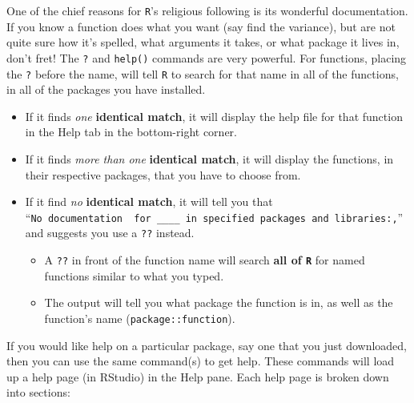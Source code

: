 \documentclass[]{article}
\providecommand{\tightlist}{%
  \setlength{\itemsep}{0pt}\setlength{\parskip}{0pt}}
\begin{document}
One of the chief reasons for \texttt{R}'s religious following is its
wonderful documentation. If you know a function does what you want (say
find the variance), but are not quite sure how it's spelled, what
arguments it takes, or what package it lives in, don't fret! The
\texttt{?} and \texttt{help()} commands are very powerful. For
functions, placing the \texttt{?} before the name, will tell \texttt{R}
to search for that name in all of the functions, in all of the packages
you have installed.

\begin{itemize}
\item
  If it finds \emph{one} \textbf{identical match}, it will display the
  help file for that function in the Help tab in the bottom-right
  corner.\\
\item
  If it finds \emph{more than one} \textbf{identical match}, it will
  display the functions, in their respective packages, that you have to
  choose from.\\
\item
  If it find \emph{no} \textbf{identical match}, it will tell you that
  ``\texttt{No\ documentation\ \ for\ \_\_\_\_\ in\ specified\ packages\ and\ libraries:,}''
  and suggests you use a \texttt{??} instead.

  \begin{itemize}
  \tightlist
  \item
    A \texttt{??} in front of the function name will search \textbf{all
    of \texttt{R}} for named functions similar to what you typed.\\
  \item
    The output will tell you what package the function is in, as well as
    the function's name (\texttt{package::function}).
  \end{itemize}
\end{itemize}

\vspace{0.25cm}

If you would like help on a particular package, say one that you just
downloaded, then you can use the same command(s) to get help. These
commands will load up a help page (in RStudio) in the Help pane. Each
help page is broken down into sections:
\end{document}
